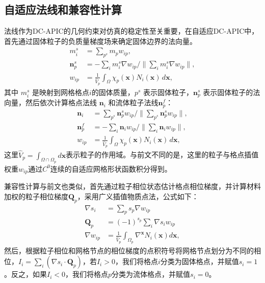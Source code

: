 \subsection{自适应法线和兼容性计算}
法线作为DC-APIC的几何约束对仿真的稳定性至关重要，在自适应DC-APIC中，首先通过固体粒子的负质量梯度场来确定固体边界的法向量。
\begin{equation}
\begin{aligned}
m_i^s &= \sum_{p^s} m_p w_{ip},\\
\mathbf{n}_p^s &= -\sum_i m_i^s \nabla w_{ip} / \| \sum_i m_i^s \nabla w_{ip} \| ,\\
w_{ip} &= \frac{1}{\hat{V}_p} \int_{\Omega} \chi_p(\mathbf{x}) N_i(\mathbf{x}) \, d\mathbf{x},
\end{aligned}
\label{eq:norm1}
\end{equation}
其中 $m_i^s$ 是映射到网格格点$i$的固体质量，$p^s$ 表示固体粒子，$\mathbf{n}_p^s$ 表示固体粒子的法向量，然后依次计算格点法线 $\mathbf{n}_i$ 和流体粒子法线$\mathbf{n}_p^f$：
\begin{equation}  
    \begin{aligned}
    \mathbf{n}_i &= \sum_{p^s} \mathbf{n}_p^s w_{ip} / \| \sum_{p^s} \mathbf{n}_p^s w_{ip} \| ,\\
    \mathbf{n}_p^f &= -\sum_i \mathbf{n}_i w_{ip} / \| \sum_i \mathbf{n}_i w_{ip} \|,\\
    w_{ip} &= \frac{1}{\hat{V}_p} \int_{\Omega} \chi_p(\mathbf{x}) N_i(\mathbf{x}) \, d\mathbf{x},
    \end{aligned}
    \label{eq:norm2}
\end{equation}
这里$\hat{V}_p = \int_{\Omega\cap\Omega_p} d\mathbf{x}$表示粒子的作用域。与前文不同的是，这里的粒子与格点插值权重$w_{ip}$通过$C^0$连续的自适应网格形状函数积分得到。

兼容性计算与前文也类似，首先通过粒子相位状态估计格点相位梯度，并计算材料加权的粒子相位梯度$\mathbf{Q}_p$，采用广义插值物质点法，公式如下：
\begin{equation}
    \begin{aligned}
        \nabla s_i &= \sum_{p} s_p \nabla w_{ip} \\
        \mathbf{Q}_p &= (-1)^{s_p}\sum_{i} \nabla s_i w_{ip} \\
        \nabla w_{ip} &= \frac{1}{\hat{V}_p} \int_{\Omega_p} \nabla^{\mathbf{x}} N_i(\mathbf{x}) d\mathbf{x},
    \end{aligned}
    \label{eq:qp}
\end{equation}
然后，根据粒子相位和网格节点的相位梯度的点积符号将网格节点划分为不同的相位，$I_i=\sum_{i}(\nabla s_i \cdot \mathbf{Q}_p)$，若$I_i > 0$，我们将格点$i$分类为固体格点，并赋值$s_i=1$。反之，如果$I_i<0$，我们将格点$p$分类为流体格点，并赋值$s_i=0$。



